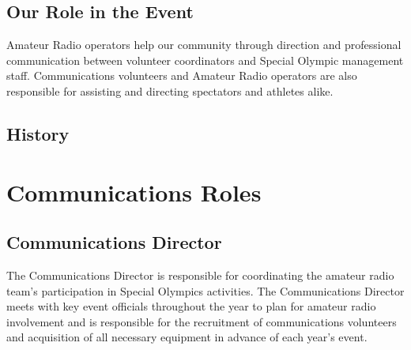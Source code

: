 \documentclass[pdflatex,letterpaper,twoside,12pt]{book}
\begin{document}

\section{Our Role in the Event}

Amateur Radio operators help our community through direction and professional communication between volunteer coordinators and Special Olympic management staff.  Communications volunteers and Amateur Radio operators are also responsible for assisting and directing spectators and athletes alike. 


\section{History}


\chapter{Communications Roles}


\section{Communications Director}

The Communications Director is responsible for coordinating the amateur radio team's participation in Special Olympics activities.  The Communications Director meets with key event officials throughout the year to plan for amateur radio involvement and is responsible for the recruitment of communications volunteers and acquisition of all necessary equipment in advance of each year's event.
\end{document}
